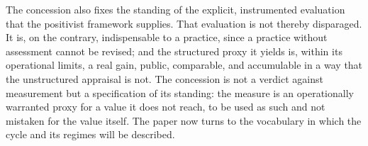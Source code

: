 The concession also fixes the standing of the explicit, instrumented evaluation that the positivist framework supplies. That evaluation is not thereby disparaged. It is, on the contrary, indispensable to a practice, since a practice without assessment cannot be revised; and the structured proxy it yields is, within its operational limits, a real gain, public, comparable, and accumulable in a way that the unstructured appraisal is not. The concession is not a verdict against measurement but a specification of its standing: the measure is an operationally warranted proxy for a value it does not reach, to be used as such and not mistaken for the value itself. The paper now turns to the vocabulary in which the cycle and its regimes will be described.
